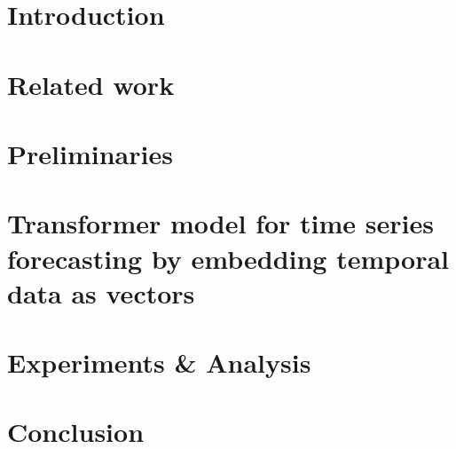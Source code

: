 \section{Introduction}


\section{Related work}\label{sec:relatedwork}




\section{Preliminaries}


\section{Transformer model for time series forecasting by embedding temporal data as vectors} %





\section{Experiments \& Analysis}\label{sec:ExpRes}


\section{Conclusion}





\appendix
%

